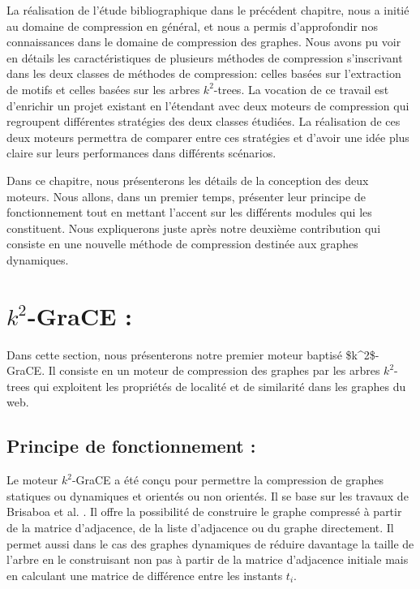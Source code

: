 \documentclass[a4paper,oneside,12pt]{report}
\theoremstyle{definition}
\begin{document}
	La réalisation de l'étude bibliographique dans le précédent chapitre, nous a initié au domaine de compression en général, et nous a permis d'approfondir nos connaissances dans le domaine de compression des graphes. Nous avons pu voir en détails les caractéristiques de plusieurs méthodes de compression s'inscrivant dans les deux classes de méthodes de compression: celles basées sur l'extraction de motifs et celles basées sur les arbres $k^2$-trees. La vocation de ce travail est d'enrichir un projet existant en l'étendant avec deux moteurs de compression qui regroupent différentes stratégies des deux classes étudiées. La réalisation de ces deux moteurs permettra de comparer entre ces stratégies et d'avoir une idée plus claire sur leurs performances dans différents scénarios.
	
	Dans ce chapitre, nous présenterons les détails de la conception des deux moteurs. Nous allons, dans un premier temps, présenter leur principe de fonctionnement tout en mettant l'accent sur les différents modules qui les constituent. Nous expliquerons juste après notre deuxième contribution qui consiste en une nouvelle  méthode de compression destinée aux graphes dynamiques.
	

	\section{$k^2$-GraCE : }
	\label{k2}

Dans cette section, nous présenterons  notre premier moteur baptisé \gls{$k^2$-GraCE}. Il consiste en un moteur de compression des graphes par les arbres $k^2$-trees qui exploitent les propriétés de localité et de similarité dans les graphes du web. 

		\subsection{Principe de fonctionnement :}
		
	Le moteur $k^2$-GraCE a été conçu pour permettre la compression de graphes statiques ou dynamiques et orientés ou non orientés. Il se base sur les travaux de Brisaboa et al. \citep{brisaboa2009k}. Il offre la possibilité de construire le graphe compressé à partir de la matrice d'adjacence, de la liste d'adjacence ou du graphe directement. Il permet aussi dans le cas des graphes dynamiques de réduire davantage la taille de l'arbre en le construisant non pas à partir de la matrice d'adjacence initiale mais en calculant une matrice de différence entre les instants $t_i$. 
	
\end{document}
